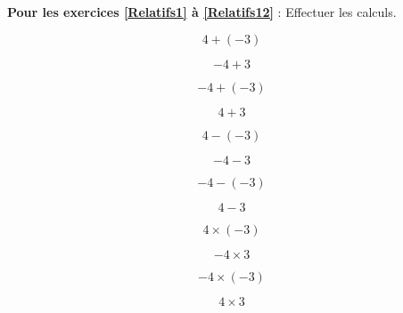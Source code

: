 \textbf{Pour les exercices \ref{Relatifs1} à \ref{Relatifs12}} : Effectuer les calculs.

\begin{multicols}{4}
    $$4+ (-3)$$

    $$-4+ 3$$

    $$-4+ (-3)$$ 

    $$4+ 3$$ 
\end{multicols}

\begin{multicols}{4}
    $$4- (-3)$$

    $$-4- 3$$

    $$-4- (-3)$$ 

    $$4- 3$$ 
\end{multicols}

\begin{multicols}{4}
    $$4\times (-3)$$

    $$-4\times 3$$

    $$-4\times (-3)$$ 

    $$4\times 3$$ 
\end{multicols}

